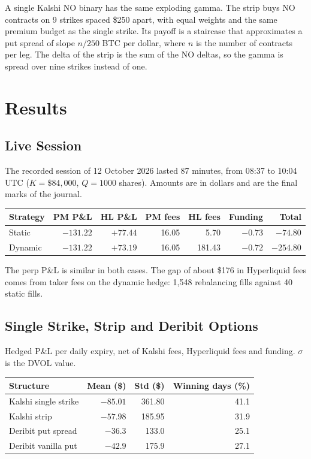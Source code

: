 \documentclass[11pt,a4paper]{article}
\begin{document}
A single Kalshi NO binary has the same exploding gamma. The strip buys NO contracts on 9 strikes spaced \$250 apart, with equal weights and the same premium budget as the single strike. Its payoff is a staircase that approximates a put spread of slope $n/250$ BTC per dollar, where $n$ is the number of contracts per leg. The delta of the strip is the sum of the NO deltas, so the gamma is spread over nine strikes instead of one.

\section{Results}

\subsection{Live Session}

The recorded session of 12 October 2026 lasted 87 minutes, from 08:37 to 10:04 UTC ($K=\$84{,}000$, $Q=1000$ shares). Amounts are in dollars and are the final marks of the journal.

\begin{center}
\begin{tabular}{lrrrrrr}
\toprule
Strategy & PM P\&L & HL P\&L & PM fees & HL fees & Funding & Total \\
\midrule
Static  & $-131.22$ & $+77.44$ & 16.05 & 5.70   & $-0.73$ & $-74.80$ \\
Dynamic & $-131.22$ & $+73.19$ & 16.05 & 181.43 & $-0.72$ & $-254.80$ \\
\bottomrule
\end{tabular}
\end{center}

The perp P\&L is similar in both cases. The gap of about \$176 in Hyperliquid fees comes from taker fees on the dynamic hedge: 1,548 rebalancing fills against 40 static fills.

\subsection{Single Strike, Strip and Deribit Options}

Hedged P\&L per daily expiry, net of Kalshi fees, Hyperliquid fees and funding. $\sigma$ is the DVOL value.

\begin{center}
\begin{tabular}{lrrr}
\toprule
Structure & Mean (\$) & Std (\$) & Winning days (\%) \\
\midrule
Kalshi single strike & $-85.01$ & 361.80 & 41.1 \\
Kalshi strip         & $-57.98$ & 185.95 & 31.9 \\
Deribit put spread   & $-36.3$  & 133.0  & 25.1 \\
Deribit vanilla put  & $-42.9$  & 175.9  & 27.1 \\
\bottomrule
\end{tabular}
\end{center}
\end{document}
